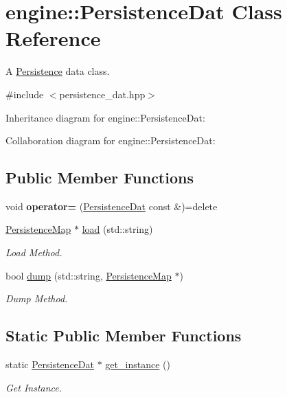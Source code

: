 \hypertarget{classengine_1_1_persistence_dat}{}\section{engine\+:\+:Persistence\+Dat Class Reference}
\label{classengine_1_1_persistence_dat}


A \hyperlink{classengine_1_1_persistence}{Persistence} data class.  




{\ttfamily \#include $<$persistence\+\_\+dat.\+hpp$>$}



Inheritance diagram for engine\+:\+:Persistence\+Dat\+:


Collaboration diagram for engine\+:\+:Persistence\+Dat\+:
\subsection*{Public Member Functions}
\begin{DoxyCompactItemize}
\item 
void {\bfseries operator=} (\hyperlink{classengine_1_1_persistence_dat}{Persistence\+Dat} const \&)=delete\hypertarget{classengine_1_1_persistence_dat_a207058814fa0d5cf6ab693eb6c2bcd58}{}\label{classengine_1_1_persistence_dat_a207058814fa0d5cf6ab693eb6c2bcd58}

\item 
\hyperlink{classengine_1_1_persistence_map}{Persistence\+Map} $\ast$ \hyperlink{classengine_1_1_persistence_dat_afd72460731bf0fab23f002ad0c895925}{load} (std\+::string)
\begin{DoxyCompactList}\small\item\em Load Method. \end{DoxyCompactList}\item 
bool \hyperlink{classengine_1_1_persistence_dat_a967c33fc78f68fb756b6d730f2fc38e0}{dump} (std\+::string, \hyperlink{classengine_1_1_persistence_map}{Persistence\+Map} $\ast$)
\begin{DoxyCompactList}\small\item\em Dump Method. \end{DoxyCompactList}\end{DoxyCompactItemize}
\subsection*{Static Public Member Functions}
\begin{DoxyCompactItemize}
\item 
static \hyperlink{classengine_1_1_persistence_dat}{Persistence\+Dat} $\ast$ \hyperlink{classengine_1_1_persistence_dat_a10d573b0dc2ac097d53b2e445625fe6f}{get\+\_\+instance} ()
\begin{DoxyCompactList}\small\item\em Get Instance. \end{DoxyCompactList}\end{DoxyCompactItemize}


